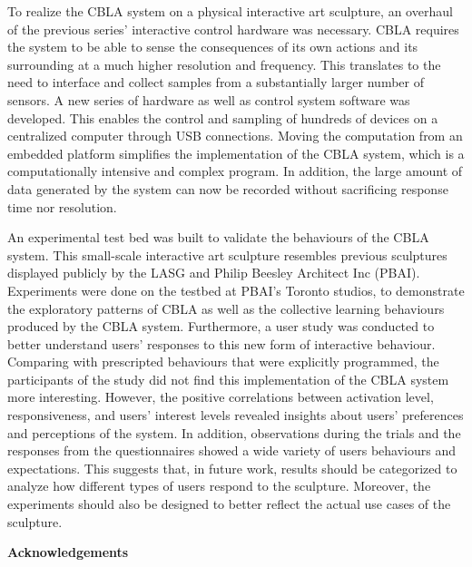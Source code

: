 To realize the CBLA system on a physical interactive art sculpture, an overhaul of the previous series' interactive control hardware was necessary. CBLA requires the system to be able to sense the consequences of its own actions and its surrounding at a much higher resolution and frequency. This translates to the need to interface and collect samples from a substantially larger number of sensors. A new series of hardware as well as control system software was developed. This enables the control and sampling of hundreds of devices on a centralized computer through USB connections. Moving the computation from an embedded platform simplifies the implementation of the CBLA system, which is a computationally intensive and complex program. In addition, the large amount of data generated by the system can now be recorded without sacrificing response time nor resolution.  

An experimental test bed was built to validate the behaviours of the CBLA system. This small-scale interactive art sculpture resembles previous sculptures displayed publicly by the LASG and Philip Beesley Architect Inc (PBAI). Experiments were done on the testbed at PBAI's Toronto studios, to demonstrate the exploratory patterns of CBLA as well as the collective learning behaviours produced by the CBLA system. Furthermore, a user study was conducted to better understand users' responses to this new form of interactive behaviour. Comparing with prescripted behaviours that were explicitly programmed, the participants of the study did not find this implementation of the CBLA system more interesting. However, the positive correlations between activation level, responsiveness, and users' interest levels revealed insights about users' preferences and perceptions of the system. In addition, observations during the trials and the responses from the questionnaires showed a wide variety of users behaviours and expectations. This suggests that, in future work, results should be categorized to analyze how different types of users respond to the sculpture. Moreover, the experiments should also be designed to better reflect the actual use cases of the sculpture. 



\cleardoublepage


\begin{center}\textbf{Acknowledgements}\end{center}

